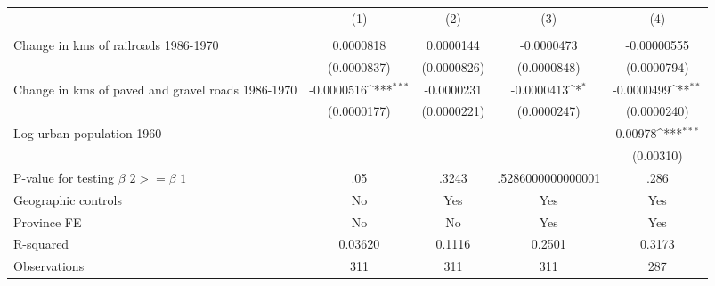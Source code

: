 {
\def\sym#1{\ifmmode^{#1}\else\(^{#1}\)\fi}
\begin{tabular}{l*{4}{c}}
\hline\hline
                &\multicolumn{1}{c}{(1)}&\multicolumn{1}{c}{(2)}&\multicolumn{1}{c}{(3)}&\multicolumn{1}{c}{(4)}\\
                &\multicolumn{1}{c}{}&\multicolumn{1}{c}{}&\multicolumn{1}{c}{}&\multicolumn{1}{c}{}\\
\hline
Change in kms of railroads 1986-1970&0.0000818         &0.0000144         &-0.0000473         &-0.00000555         \\
                &(0.0000837)         &(0.0000826)         &(0.0000848)         &(0.0000794)         \\
[1em]
Change in kms of paved and gravel roads 1986-1970&-0.0000516\sym{***}&-0.0000231         &-0.0000413\sym{*}  &-0.0000499\sym{**} \\
                &(0.0000177)         &(0.0000221)         &(0.0000247)         &(0.0000240)         \\
[1em]
Log urban population 1960&                  &                  &                  &  0.00978\sym{***}\\
                &                  &                  &                  &(0.00310)         \\
\hline
P-value for testing $\beta\_{2} >= \beta\_{1}$&      .05         &    .3243         &.5286000000000001         &     .286         \\
Geographic controls&       No         &      Yes         &      Yes         &      Yes         \\
Province FE     &       No         &       No         &      Yes         &      Yes         \\
R-squared       &  0.03620         &   0.1116         &   0.2501         &   0.3173         \\
Observations    &      311         &      311         &      311         &      287         \\
\hline\hline
\end{tabular}
}
